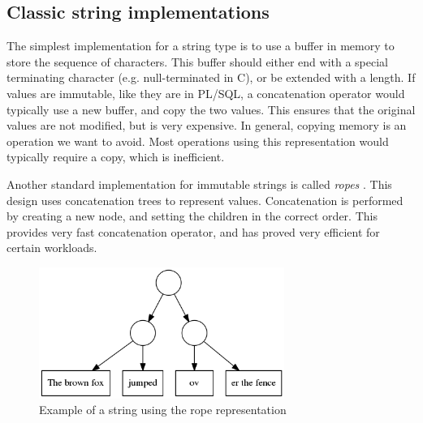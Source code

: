 \documentclass[twoside,11pt,a4paper]{article}
\newcommand{\pls}[1]{\small\texttt{#1}\normalsize}
\newcommand{\plstype}[1]{\pls{#1}}
\newcommand{\varchar}{\plstype{VARCHAR2}}
\begin{document}
\subsection{Classic string implementations}


The simplest implementation for a string type is to use a buffer in memory to store the sequence of characters. This buffer should either end with a special terminating character (e.g. null-terminated in C), or be extended with a length. If values are immutable, like they are in PL/SQL, a concatenation operator would typically use a new buffer, and copy the two values. This ensures that the original values are not modified, but is very expensive. In general, copying memory is an operation we want to avoid. Most operations using this representation would typically require a copy, which is inefficient.

Another standard implementation for immutable strings is called \textit{ropes} \cite{ropepaper}. This design uses concatenation trees to represent values. Concatenation is performed by creating a new node, and setting the children in the correct order. This provides very fast concatenation operator, and has proved very efficient for certain workloads.

\begin{figure}[h]
	\centering
	\includegraphics[width=8cm]{./graphs/rope.png}
	\caption{Example of a string using the rope representation}
	
\end{figure}
\end{document}
